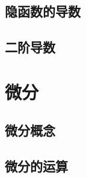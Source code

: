 \subsection{隐函数的导数}
\begin{Practice}
  \begin{question}
    \item 
    \item 
    \item 
    \item 
  \end{question}
\end{Practice}

\subsection{二阶导数}
\begin{Practice}
  \begin{question}
    \item 
    \item 
  \end{question}
\end{Practice}

\begin{Exercise}
  \begin{question}
    \item 
    \item 
    \item 
    \item 
    \item 
    \item 
    \item 
    \item 
  \end{question}
\end{Exercise}

\section{微分}
\subsection{微分概念}
\subsection{微分的运算}
\begin{Practice}
  \begin{question}
    \item 
    \item 
    \item 
    \item 
    \item 
    \item 
  \end{question}
\end{Practice}

